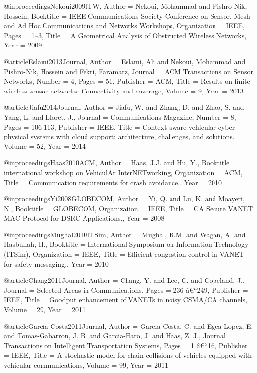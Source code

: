 {{{{@inproceedings{Nekoui2009ITW,
	Author = {Nekoui, Mohammad and Pishro-Nik, Hossein},
	Booktitle = {IEEE Communications Society Conference on Sensor, Mesh and Ad Hoc Communications and Networks Workshops},
	Organization = {IEEE},
	Pages = {1--3},
	Title = {A Geometrical Analysis of Obstructed Wireless Networks},
	Year = {2009}}

@article{Eslami2013Journal,
	Author = {Eslami, Ali and Nekoui, Mohammad and Pishro-Nik, Hossein and Fekri, Faramarz},
	Journal = {ACM Transactions on Sensor Networks},
	Number = {4},
	Pages = {51},
	Publisher = {ACM},
	Title = {Results on finite wireless sensor networks: Connectivity and coverage},
	Volume = {9},
	Year = {2013}}


@article{Jiafu2014Journal,
	Author = {Jiafu, W. and Zhang, D. and Zhao, S. and Yang, L. and Lloret, J.},
	Journal = {Communications Magazine},
	Number = {8},
	Pages = {106-113},
	Publisher = {IEEE},
	Title = {Context-aware vehicular cyber-physical systems with cloud support: architecture, challenges, and solutions},
	Volume = {52},
	Year = {2014}}

@inproceedings{Haas2010ACM,
	Author = {Haas, J.J. and Hu, Y.},
	Booktitle = {international workshop on VehiculAr InterNETworking},
	Organization = {ACM},
	Title = {Communication requirements for crash avoidance.},
	Year = {2010}}

@inproceedings{Yi2008GLOBECOM,
	Author = {Yi, Q. and Lu, K. and Moayeri, N.},
	Booktitle = {GLOBECOM},
	Organization = {IEEE},
	Title = {CA Secure VANET MAC Protocol for DSRC Applications.},
	Year = {2008}}

@inproceedings{Mughal2010ITSim,
	Author = {Mughal, B.M. and Wagan, A. and Hasbullah, H.},
	Booktitle = {International Symposium on Information Technology (ITSim)},
	Organization = {IEEE},
	Title = {Efficient congestion control in VANET for safety messaging.},
	Year = {2010}}

@article{Chang2011Journal,
	Author = {Chang, Y. and Lee, C. and Copeland, J.},
	Journal = {Selected Areas in Communications},
	Pages = {236 â€“249},
	Publisher = {IEEE},
	Title = {Goodput enhancement of VANETs in noisy CSMA/CA channels},
	Volume = {29},
	Year = {2011}}

@article{Garcia-Costa2011Journal,
	Author = {Garcia-Costa, C. and Egea-Lopez, E. and Tomas-Gabarron, J. B. and Garcia-Haro, J. and Haas, Z. J.},
	Journal = {Transactions on Intelligent Transportation Systems},
	Pages = {1 â€“16},
	Publisher = {IEEE},
	Title = {A stochastic model for chain collisions of vehicles equipped with vehicular communications},
	Volume = {99},
	Year = {2011}}

}}}}
